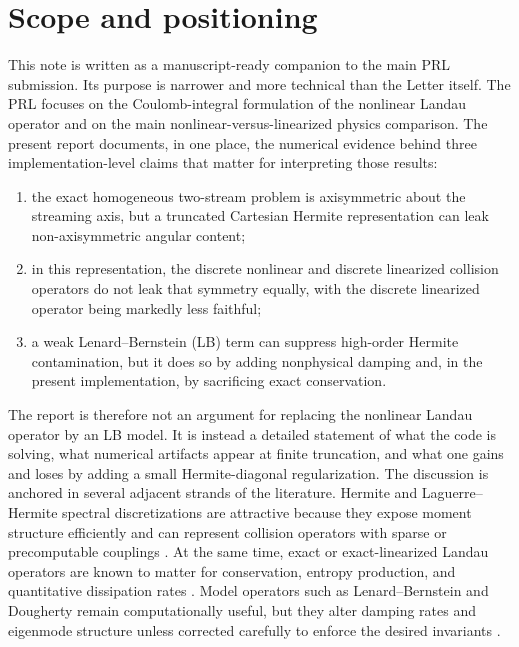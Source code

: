 \documentclass[11pt]{article}
\begin{document}
\section{Scope and positioning}
This note is written as a manuscript-ready companion to the main PRL submission.
Its purpose is narrower and more technical than the Letter itself.
The PRL focuses on the Coulomb-integral formulation of the nonlinear Landau operator and on the main nonlinear-versus-linearized physics comparison.
The present report documents, in one place, the numerical evidence behind three implementation-level claims that matter for interpreting those results:
\begin{enumerate}[leftmargin=1.5em]
    \item the exact homogeneous two-stream problem is axisymmetric about the streaming axis, but a truncated Cartesian Hermite representation can leak non-axisymmetric angular content;
    \item in this representation, the discrete nonlinear and discrete linearized collision operators do not leak that symmetry equally, with the discrete linearized operator being markedly less faithful;
    \item a weak Lenard--Bernstein (LB) term can suppress high-order Hermite contamination, but it does so by adding nonphysical damping and, in the present implementation, by sacrificing exact conservation.
\end{enumerate}
The report is therefore not an argument for replacing the nonlinear Landau operator by an LB model.
It is instead a detailed statement of what the code is solving, what numerical artifacts appear at finite truncation, and what one gains and loses by adding a small Hermite-diagonal regularization.
The discussion is anchored in several adjacent strands of the literature.
Hermite and Laguerre--Hermite spectral discretizations are attractive because they expose moment structure efficiently and can represent collision operators with sparse or precomputable couplings \cite{li2021hermite,mandell2018laguerre}.
At the same time, exact or exact-linearized Landau operators are known to matter for conservation, entropy production, and quantitative dissipation rates \cite{madsen2013linearized,pan2020exact,hirvijoki2022metriplectic,pezzi2017solarwind}.
Model operators such as Lenard--Bernstein and Dougherty remain computationally useful, but they alter damping rates and eigenmode structure unless corrected carefully to enforce the desired invariants \cite{lenard1958plasma,dougherty1964model,jorge2019collisionality,jeyakumar2024lb,belli2017advanced}.
\end{document}
